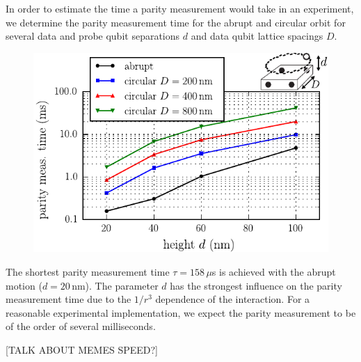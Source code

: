 In order to estimate the time a parity measurement would take in an experiment, we determine the parity measurement time for the abrupt and circular orbit for several data and probe qubit separations $d$ and data qubit lattice spacings $D$.

\begin{figure}[H]
	\includegraphics[width=\linewidth]{../Figures/tau_d_D}
	\caption{}
	\label{FIG:tau}
\end{figure}

The shortest parity measurement time $\tau=158\, \mu$s is achieved with the abrupt motion ($d=20\, $nm).
The parameter $d$ has the strongest influence on the parity measurement time due to the $1/r^3$ dependence of the interaction.
For a reasonable experimental implementation, we expect the parity measurement to be of the order of several milliseconds.

[TALK ABOUT MEMES SPEED?]


 
